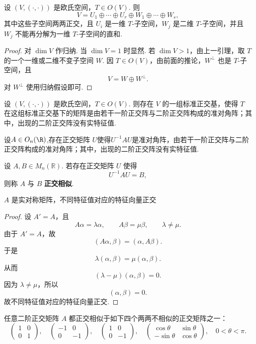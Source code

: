 \begin{lemma}
	设 $(V,(\cdot,\cdot))$ 是欧氏空间，$T\in O(V)$. 则
	\[
	V=U_1\oplus\cdots\oplus U_r\oplus W_1\oplus\cdots\oplus W_s,
	\]
	其中这些子空间两两正交，且 $U_i$ 是一维 $T$-子空间，$W_j$ 是二维 $T$-子空间，并且 $W_j$ 不能再分解为一维 $T$-子空间的直和.
\end{lemma}
\begin{proof}
	对 $\dim V$ 作归纳. 当 $\dim V=1$ 时显然. 若 $\dim V>1$，由上一引理，取 $T$ 的一个一维或二维不变子空间 $W$. 因 $T\in O(V)$，由前面的推论，$W^\perp$ 也是 $T$-子空间，且
	\[
	V=W\oplus W^\perp.
	\]
	对 $W^\perp$ 使用归纳假设即可.
\end{proof}

\begin{corollary}
	设 $(V,(\cdot,\cdot))$ 是欧氏空间，$T\in O(V)$. 则存在 $V$ 的一组标准正交基，使得 $T$ 在这组标准正交基下的矩阵是由若干一阶正交阵与二阶正交阵构成的准对角阵；其中，出现的二阶正交阵没有实特征值.
\end{corollary}
\begin{corollary}
	设$A\in O_n(\R)$,存在正交矩阵 $U$使得$ U^{-1}AU$是准对角阵，由若干一阶正交阵与二阶正交阵构成的准对角阵；其中，出现的二阶正交阵没有实特征值.

\end{corollary}
\begin{definition}\label{p1:concept:c6-l1225}
	设 $A,B\in M_n(\mathbb{R})$. 若存在正交矩阵 $U$ 使得
	\[
	U^{-1}AU=B,
	\]
	则称 $A$ 与 $B$ \textbf{正交相似}.
\end{definition}
\begin{lemma}
	$A$ 是实对称矩阵，不同特征值对应的特征向量正交
\end{lemma}
\begin{proof}
	设 $A'=A$，且
	\[
	A\alpha=\lambda\alpha,\qquad A\beta=\mu\beta,\qquad \lambda\ne\mu.
	\]
	由于 $A'=A$，故
	\[
	(A\alpha,\beta)=(\alpha,A\beta).
	\]
	于是
	\[
	\lambda(\alpha,\beta)=\mu(\alpha,\beta).
	\]
	从而
	\[
	(\lambda-\mu)(\alpha,\beta)=0.
	\]
	因为 $\lambda\ne\mu$，所以
	\[
	(\alpha,\beta)=0.
	\]
	故不同特征值对应的特征向量正交.
\end{proof}
\begin{lemma}
	任意二阶正交矩阵 $A$ 都正交相似于如下四个两两不相似的正交矩阵之一：
		\[
		\begin{pmatrix}
			1&0\\
			0&1
		\end{pmatrix},
		\quad
		\begin{pmatrix}
			-1&0\\
			0&-1
		\end{pmatrix},
		\quad
		\begin{pmatrix}
			1&0\\
			0&-1
		\end{pmatrix},
		\quad
		\begin{pmatrix}
			\cos\theta&\sin\theta\\
			-\sin\theta&\cos\theta
		\end{pmatrix},
		\quad 0<\theta<\pi .
		\]
\end{lemma}

